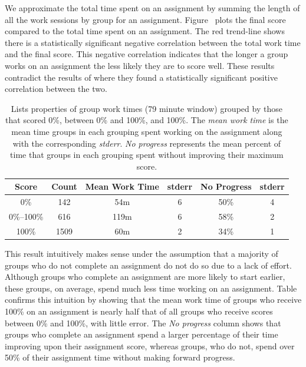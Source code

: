 We approximate the total time spent on an assignment by summing the length of
all the work sessions by group for an
assignment. Figure~ plots the final score compared to
the total time spent on an assignment. The red trend-line shows there is a
statistically significant negative correlation between the total work time and
the final score. This negative correlation indicates that the longer a group
works on an assignment the less likely they are to score well. These results
contradict the results of \spacco{} where they found a statistically
significant positive correlation between the two.

\begin{table}
\centering
\begin{tabular}{|c||c|c|c|c|c|} \hline
Score & Count & Mean Work Time & stderr & No Progress & stderr \\ \hline \hline
0\% & 142 & 54m & 6 & 50\% & 4 \\ \hline
0\%--100\% & 616 & 119m & 6 & 58\% & 2 \\ \hline
100\% & 1509 & 60m & 2 & 34\% & 1 \\ \hline
\end{tabular}
\caption{Lists properties of group work times (79 minute window) grouped by
  those that scored 0\%, between 0\% and 100\%, and 100\%. The \emph{mean work
    time} is the mean time groups in each grouping spent working on the
  assignment along with the corresponding \emph{stderr}. \emph{No progress}
  represents the mean percent of time that groups in each grouping spent
  without improving their maximum score.}
\end{table}

This result intuitively makes sense under the assumption that a majority of
groups who do not complete an assignment do not do so due to a lack of
effort. Although groups who complete an assignment are more likely to start
earlier, these groups, on average, spend much less time working on an
assignment. Table~ confirms this intuition by showing
that the mean work time of groups who receive 100\% on an assignment is nearly
half that of all groups who receive scores between 0\% and 100\%, with little
error. The \emph{No progress} column shows that groups who complete an
assignment spend a larger percentage of their time improving upon their
assignment score, whereas groups, who do not, spend over 50\% of their
assignment time without making forward progress.

